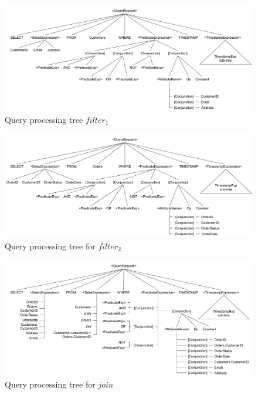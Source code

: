\begin{figure}[t]
  \centering
    \includegraphics[width=\textwidth]{./figures/design_pattern/qpt_filter_customers.pdf}
  \caption{Query processing tree $filter_1$}
  \label{fig:qpt_filter_customers}
\end{figure}

\begin{figure}[t]
  \centering
    \includegraphics[width=\textwidth]{./figures/design_pattern/qpt_filter_orders.pdf}
  \caption{Query processing tree for $filter_2$}
  \label{fig:qpt_filter_orders}
\end{figure}

\begin{figure}[t]
  \centering
    \includegraphics[width=\textwidth]{./figures/design_pattern/qpt_join.pdf}
  \caption{Query processing tree for $join$}
  \label{fig:qpt_join}
\end{figure}

